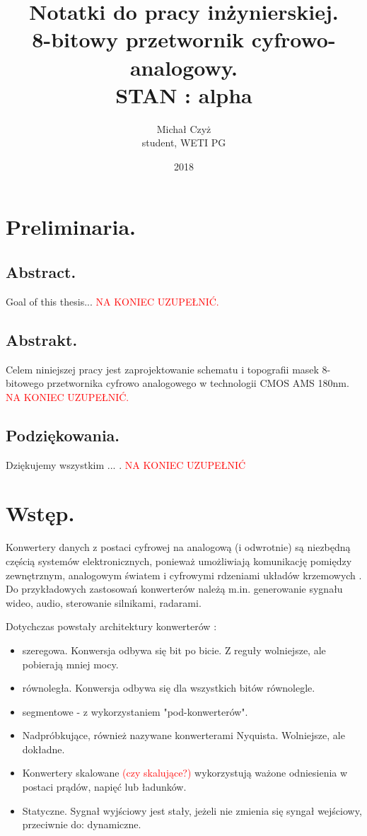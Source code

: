 \documentclass[10pt,a4paper]{report}
\title{Notatki do pracy inżynierskiej. \\ 8-bitowy przetwornik cyfrowo-analogowy. \\ STAN : alpha}
\date{2018}
\author{Michał Czyż \\ student, WETI PG}
\begin{document}
	\maketitle
	
	\tableofcontents
	\newpage
	\chapter{Preliminaria.}
	\section{Abstract.}
	{	Goal of this thesis... \textcolor{red}{NA KONIEC UZUPEŁNIĆ.} }

	\section{Abstrakt.}
	{	Celem niniejszej pracy jest zaprojektowanie schematu i topografii masek 8-bitowego przetwornika cyfrowo analogowego w technologii CMOS AMS 180nm. \textcolor{red}{NA KONIEC UZUPEŁNIĆ.} }
	
	\section{Podziękowania.}
	{	Dziękujemy wszystkim ... . \textcolor{red}{NA KONIEC UZUPEŁNIĆ} }
	
	\chapter{Wstęp.}
	{	Konwertery danych z postaci cyfrowej na analogową (i odwrotnie) są niezbędną częścią systemów elektronicznych, ponieważ umożliwiają komunikację pomiędzy zewnętrznym, analogowym światem i cyfrowymi rdzeniami układów krzemowych \cite{integconv}. Do przykładowych zastosowań konwerterów należą m.in. generowanie sygnału wideo, audio, sterowanie silnikami, radarami. }
	
	{	Dotychczas powstały architektury konwerterów \cite{integconv} \cite{cmosanal}:
		\begin{itemize}
			\item szeregowa. Konwersja odbywa się bit po bicie. Z reguły wolniejsze, ale pobierają mniej mocy.
			\item równoległa. Konwersja odbywa się dla wszystkich bitów równolegle.
			\item segmentowe - z wykorzystaniem "pod-konwerterów".
			\item Nadpróbkujące, również nazywane konwerterami Nyquista. Wolniejsze, ale dokładne.
			\item Konwertery skalowane \textcolor{red}{(czy skalujące?)} wykorzystują ważone odniesienia w postaci prądów, napięć lub ładunków.
			\item Statyczne. Sygnał wyjściowy jest stały, jeżeli nie zmienia się syngał wejściowy, przeciwnie do: dynamiczne.
		\end{itemize} }
\end{document}

